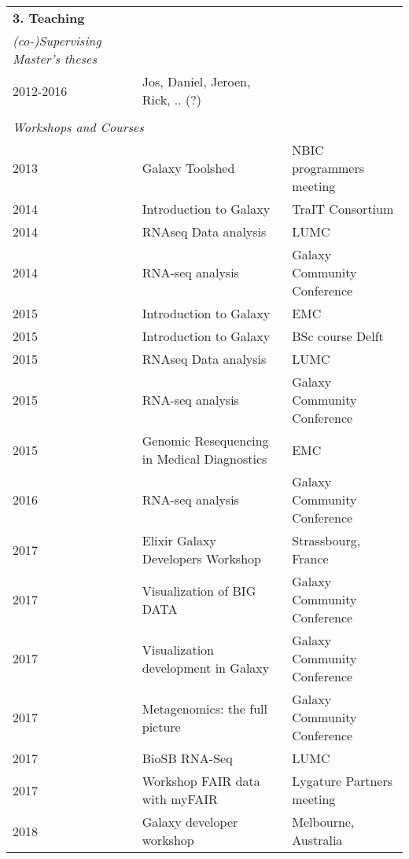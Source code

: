 \begin{table}
    \begin{tabular}{lll}
        \textbf{3. Teaching} \\
        \textit{(co-)Supervising Master’s theses} \\
        2012-2016 & Jos, Daniel, Jeroen, Rick, .. (?) \\
        \\
        \multicolumn{3}{l}{\textit{Workshops and Courses}} \\
        2013 & Galaxy Toolshed                                 & NBIC programmers meeting \\
        2014 & Introduction to Galaxy                          & TraIT Consortium \\
        2014 & RNAseq Data analysis                            & LUMC \\
        2014 & RNA-seq analysis                                & Galaxy Community Conference \\
        2015 & Introduction to Galaxy                          & EMC \\
        2015 & Introduction to Galaxy                          & BSc course Delft \\
        2015 & RNAseq Data analysis                            & LUMC \\
        2015 & RNA-seq analysis                                & Galaxy Community Conference \\
        2015 & Genomic Resequencing in Medical Diagnostics     & EMC \\
        2016 & RNA-seq analysis                                & Galaxy Community Conference \\
        2017 & Elixir Galaxy Developers Workshop               & Strassbourg, France \\
        2017 & Visualization of BIG DATA                       & Galaxy Community Conference \\
        2017 & Visualization development in Galaxy             & Galaxy Community Conference \\
        2017 & Metagenomics: the full picture                  & Galaxy Community Conference \\
        2017 & BioSB RNA-Seq                                   & LUMC \\
        2017 & Workshop FAIR data with myFAIR                  & Lygature Partners meeting \\
        2018 & Galaxy developer workshop                       & Melbourne, Australia \\
    \end{tabular}
\end{table}

\normalsize
